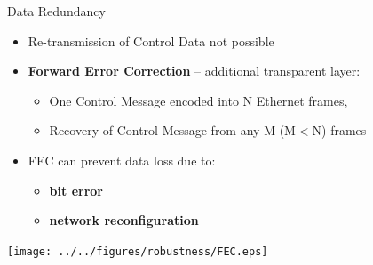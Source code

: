 \documentclass[compress,red]{beamer}
\begin{document}
\begin{frame}{Data Redundancy}

  \begin{itemize}
    \item Re-transmission of Control Data not possible
	\item {\bf Forward Error Correction}  -- additional transparent layer:
	\begin{itemize}
		\item One Control Message encoded into N Ethernet frames,
		\item Recovery of Control Message from any M (M$<$N) frames
	\end{itemize}
	\item FEC can prevent data loss due to:
	\begin{itemize}	
		\item {\bf bit error} 
		\item {\bf network reconfiguration}
	\end{itemize}	
  \end{itemize}
  
  	\begin{center}
      \texttt{[image: ../../figures/robustness/FEC.eps]}
    \end{center}
  
\end{frame}
\end{document}
